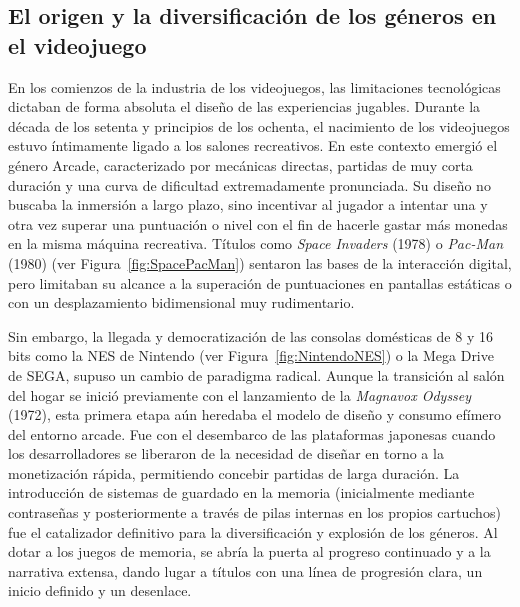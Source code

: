 \subsection{El origen y la diversificación de los géneros en el videojuego}

En los comienzos de la industria de los videojuegos, las limitaciones tecnológicas dictaban de forma absoluta el diseño de las experiencias jugables. Durante la década de los setenta y principios de los ochenta, el nacimiento de los videojuegos estuvo íntimamente ligado a los salones recreativos. En este contexto emergió el género Arcade, caracterizado por mecánicas directas, partidas de muy corta duración y una curva de dificultad extremadamente pronunciada. Su diseño no buscaba la inmersión a largo plazo, sino incentivar al jugador a intentar una y otra vez superar una puntuación o nivel con el fin de hacerle gastar más monedas en la misma máquina recreativa. Títulos como \textit{Space Invaders} (1978)\cite{space_invaders_game} o \textit{Pac-Man} (1980)\cite{pacman_game} (ver Figura~\ref{fig:SpacePacMan}) sentaron las bases de la interacción digital, pero limitaban su alcance a la superación de puntuaciones en pantallas estáticas o con un desplazamiento bidimensional muy rudimentario.

Sin embargo, la llegada y democratización de las consolas domésticas de 8 y 16 bits como la NES de Nintendo (ver Figura~\ref{fig:NintendoNES}) o la Mega Drive de SEGA, supuso un cambio de paradigma radical. Aunque la transición al salón del hogar se inició previamente con el lanzamiento de la \textit{Magnavox Odyssey} (1972), esta primera etapa aún heredaba el modelo de diseño y consumo efímero del entorno arcade. Fue con el desembarco de las plataformas japonesas cuando los desarrolladores se liberaron de la necesidad de diseñar en torno a la monetización rápida, permitiendo concebir partidas de larga duración. La introducción de sistemas de guardado en la memoria (inicialmente mediante contraseñas y posteriormente a través de pilas internas en los propios cartuchos) fue el catalizador definitivo para la diversificación y explosión de los géneros. Al dotar a los juegos de memoria, se abría la puerta al progreso continuado y a la narrativa extensa, dando lugar a títulos con una línea de progresión clara, un inicio definido y un desenlace.

